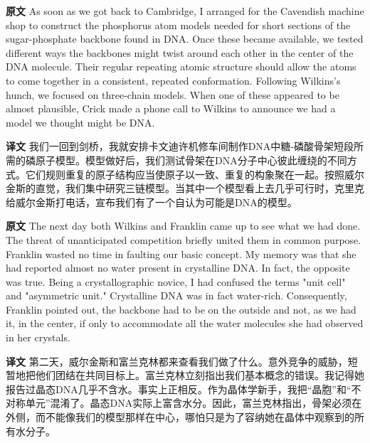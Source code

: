 \documentclass[UTF8,zihao=-4]{ctexart}
\newcommand{\BodyFont}{\fontsize{10.5pt}{15.5pt}\selectfont}
\renewenvironment{quote}{\par\noindent\begingroup\BodyFont}{\par\endgroup}
\begin{document}
\begin{quote}
\noindent\textbf{原文} As soon as we got back to Cambridge, I arranged for the Cavendish machine shop to construct the phosphorus atom models needed for short sections of the sugar-phosphate backbone found in DNA. Once these became available, we tested different ways the backbones might twist around each other in the center of the DNA molecule. Their regular repeating atomic structure should allow the atoms to come together in a consistent, repeated conformation. Following Wilkins's hunch, we focused on three-chain models. When one of these appeared to be almost plausible, Crick made a phone call to Wilkins to announce we had a model we thought might be DNA.

\smallskip
\noindent\textbf{译文} 我们一回到剑桥，我就安排卡文迪许机修车间制作DNA中糖-磷酸骨架短段所需的磷原子模型。模型做好后，我们测试骨架在DNA分子中心彼此缠绕的不同方式。它们规则重复的原子结构应当使原子以一致、重复的构象聚在一起。按照威尔金斯的直觉，我们集中研究三链模型。当其中一个模型看上去几乎可行时，克里克给威尔金斯打电话，宣布我们有了一个自认为可能是DNA的模型。
\end{quote}

\begin{quote}
\noindent\textbf{原文} The next day both Wilkins and Franklin came up to see what we had done. The threat of unanticipated competition briefly united them in common purpose. Franklin wasted no time in faulting our basic concept. My memory was that she had reported almost no water present in crystalline DNA. In fact, the opposite was true. Being a crystallographic novice, I had confused the terms "unit cell" and "asymmetric unit." Crystalline DNA was in fact water-rich. Consequently, Franklin pointed out, the backbone had to be on the outside and not, as we had it, in the center, if only to accommodate all the water molecules she had observed in her crystals.

\smallskip
\noindent\textbf{译文} 第二天，威尔金斯和富兰克林都来查看我们做了什么。意外竞争的威胁，短暂地把他们团结在共同目标上。富兰克林立刻指出我们基本概念的错误。我记得她报告过晶态DNA几乎不含水。事实上正相反。作为晶体学新手，我把“晶胞”和“不对称单元”混淆了。晶态DNA实际上富含水分。因此，富兰克林指出，骨架必须在外侧，而不能像我们的模型那样在中心，哪怕只是为了容纳她在晶体中观察到的所有水分子。
\end{quote}
\end{document}
